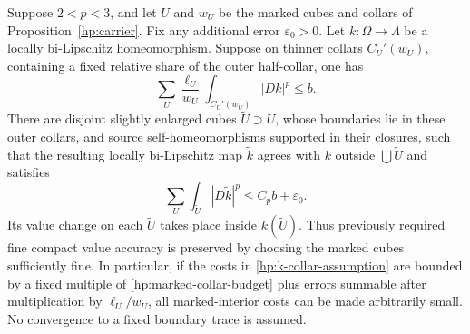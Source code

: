 \begin{lemma}\label{hp:hide-cubes}
Suppose $2<p<3$, and let $U$ and $w_U$ be the marked cubes and
collars of Proposition~\ref{hp:carrier}.  Fix any additional error
$\varepsilon_0>0$.  Let
$k:\Omega\to\Lambda$ be a locally bi-Lipschitz homeomorphism.
Suppose on thinner collars $C_U'(w_U)$, containing a fixed
relative share of the outer half-collar, one has
\begin{equation}\label{hp:k-collar-assumption}
 \sum_U\frac{\ell_U}{w_U}
        \int_{C_U'(w_U)}|Dk|^p\leq b.
\end{equation}
There are disjoint slightly enlarged cubes $\widetilde U\supset U$,
whose boundaries lie in these outer collars, and source
self-homeomorphisms supported in their closures, such that the
resulting locally bi-Lipschitz map $\widetilde k$ agrees with $k$
outside $\bigcup\widetilde U$ and satisfies
\begin{equation}\label{hp:hidden-cost}
 \sum_U\int_{\widetilde U}|D\widetilde k|^p
                \leq C_p b+\varepsilon_0.
\end{equation}
Its value change on each $\widetilde U$ takes place inside
$k(\widetilde U)$.  Thus previously required fine compact value
accuracy is preserved by choosing the marked cubes sufficiently
fine.  In particular, if the costs in
\eqref{hp:k-collar-assumption} are bounded by a fixed multiple of
\eqref{hp:marked-collar-budget} plus errors summable after
multiplication by $\ell_U/w_U$, all marked-interior costs can be
made arbitrarily small.  No convergence to a fixed boundary trace
is assumed.
\end{lemma}

